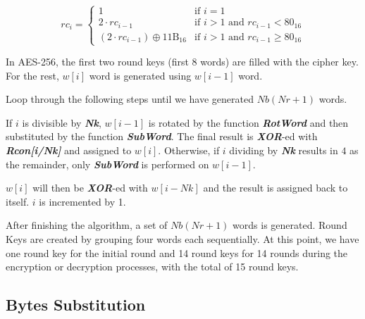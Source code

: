 \documentclass[a4paper, 10pt]{article}
\begin{document}
                    \begin{multicols}{2}
                        \begin{equation}
                            rc_{i}=
                            \begin{cases}
                                1 & \text{if } i=1\\
                                2 \cdot  rc_{i-1} & \text{if } i>1 \text{ and } rc_{i-1}<80_{16}\\
                                \left(2 \cdot  rc_{i-1}\right)\oplus 11\text{B}_{16} & \text{if } i>1 \text{ and } rc_{i-1} \ge 80_{16}
                            \end{cases}
                        \end{equation}

                In AES-256, the first two round keys (first 8 words) are filled with the cipher key. For the rest, $w[i]$ word is generated using $w[i-1]$ word.

                Loop through the following steps until we have generated $Nb(Nr+1)$ words.

                If $i$ is divisible by \textbf{\textit{Nk}}, $w[i-1]$ is rotated by the function \textbf{\textit{RotWord}} and then substituted by the function \textbf{\textit{SubWord}}. The final result is \textbf{\textit{XOR}}-ed with \textbf{\textit{Rcon[i/Nk]}} and assigned to $w[i]$. Otherwise, if $i$ dividing by \textbf{\textit{Nk}} results in $4$ as the remainder, only \textbf{\textit{SubWord}} is performed on $w[i-1]$.

                $w[i]$ will then be \textbf{\textit{XOR}}-ed with $w[i-Nk]$ and the result is assigned back to itself. $i$ is incremented by 1.

                After finishing the algorithm, a set of $Nb(Nr+1)$ words is generated. Round Keys are created by grouping four words each sequentially. At this point, we have one round key for the initial round and 14 round keys for 14 rounds during the encryption or decryption processes, with the total of 15 round keys.

            \subsection{Bytes Substitution}


\end{multicols}
\end{document}
